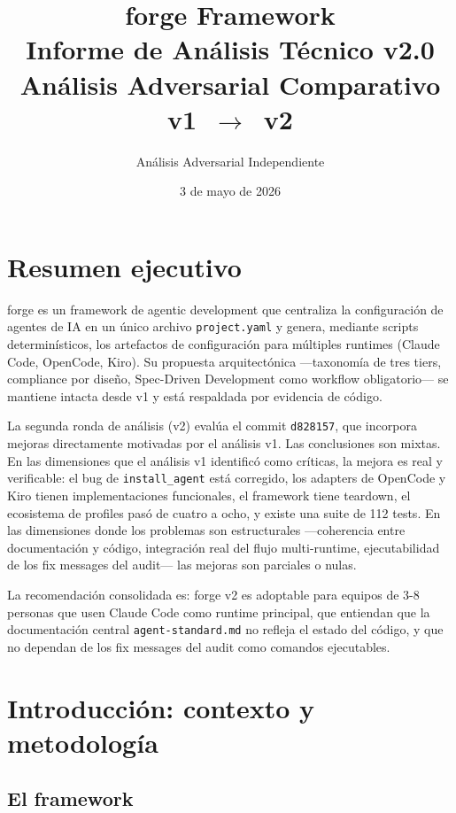 \documentclass[12pt,a4paper]{article}
\title{\textbf{forge Framework}\\
  \large Informe de An\'alisis T\'ecnico v2.0\\
  An\'alisis Adversarial Comparativo v1~$\rightarrow$~v2}
\author{An\'alisis Adversarial Independiente}
\date{3 de mayo de 2026}
\begin{document}
\maketitle
\tableofcontents
\newpage

\section{Resumen ejecutivo}

forge es un framework de agentic development que centraliza la configuraci\'on
de agentes de IA en un \'unico archivo \texttt{project.yaml} y genera, mediante
scripts determin\'isticos, los artefactos de configuraci\'on para m\'ultiples
runtimes (Claude Code, OpenCode, Kiro). Su propuesta arquitect\'onica ---taxonom\'ia
de tres tiers, compliance por dise\~no, Spec-Driven Development como workflow
obligatorio--- se mantiene intacta desde v1 y est\'a respaldada por evidencia de
c\'odigo.

La segunda ronda de an\'alisis (v2) eval\'ua el commit \texttt{d828157}, que
incorpora mejoras directamente motivadas por el an\'alisis v1. Las conclusiones
son mixtas. En las dimensiones que el an\'alisis v1 identific\'o como cr\'iticas,
la mejora es real y verificable: el bug de \texttt{install\_agent} est\'a
corregido, los adapters de OpenCode y Kiro tienen implementaciones funcionales,
el framework tiene teardown, el ecosistema de profiles pas\'o de cuatro a ocho, y
existe una suite de 112 tests. En las dimensiones donde los problemas son
estructurales ---coherencia entre documentaci\'on y c\'odigo, integraci\'on real
del flujo multi-runtime, ejecutabilidad de los fix messages del audit--- las
mejoras son parciales o nulas.

La recomendaci\'on consolidada es: forge v2 es adoptable para equipos de 3-8
personas que usen Claude Code como runtime principal, que entiendan que la
documentaci\'on central \texttt{agent-standard.md} no refleja el estado del
c\'odigo, y que no dependan de los fix messages del audit como comandos
ejecutables.

\section{Introducci\'on: contexto y metodolog\'ia}

\subsection{El framework}
\end{document}
